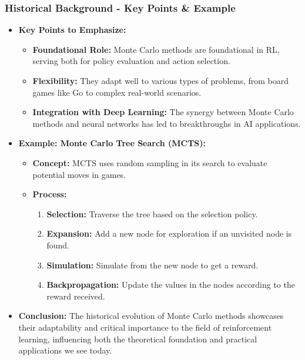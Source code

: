 \documentclass[aspectratio=169]{beamer}
\begin{document}
\begin{frame}[fragile]
    \frametitle{Historical Background - Key Points & Example}
    \begin{itemize}
        \item \textbf{Key Points to Emphasize:}
        \begin{itemize}
            \item \textbf{Foundational Role:} Monte Carlo methods are foundational in RL, serving both for policy evaluation and action selection.
            \item \textbf{Flexibility:} They adapt well to various types of problems, from board games like Go to complex real-world scenarios.
            \item \textbf{Integration with Deep Learning:} The synergy between Monte Carlo methods and neural networks has led to breakthroughs in AI applications.
        \end{itemize}

        \item \textbf{Example: Monte Carlo Tree Search (MCTS):}
        \begin{itemize}
            \item \textbf{Concept:} MCTS uses random sampling in its search to evaluate potential moves in games.
            \item \textbf{Process:} 
            \begin{enumerate}
                \item \textbf{Selection:} Traverse the tree based on the selection policy.
                \item \textbf{Expansion:} Add a new node for exploration if an unvisited node is found.
                \item \textbf{Simulation:} Simulate from the new node to get a reward.
                \item \textbf{Backpropagation:} Update the values in the nodes according to the reward received.
            \end{enumerate}
        \end{itemize}

        \item \textbf{Conclusion:} The historical evolution of Monte Carlo methods showcases their adaptability and critical importance to the field of reinforcement learning, influencing both the theoretical foundation and practical applications we see today.
    \end{itemize}
\end{frame}
\end{document}
